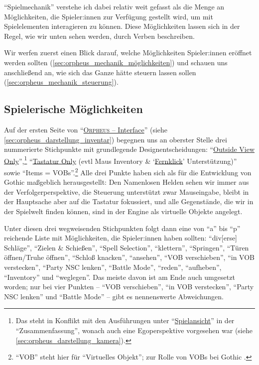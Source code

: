 \documentclass[a5paper,pagesize]{scrbook}
\begin{document}
\enquote{Spielmechanik} verstehe ich dabei relativ weit gefasst als die Menge an Möglichkeiten, die Spieler:innen zur Verfügung gestellt wird, um mit Spielelementen interagieren zu können.\autocite[255]{jaervinen_games_2008}
Diese Möglichkeiten lassen sich in der Regel, wie wir unten sehen werden, durch Verben beschreiben.\autocite[263]{jaervinen_games_2008}

Wir werfen zuerst einen Blick darauf, welche Möglichkeiten Spieler:innen eröffnet werden sollten (\autoref{sec:orpheus_mechanik_möglichkeiten}) und schauen uns anschließend an, wie sich das Ganze hätte steuern lassen sollen (\autoref{sec:orpheus_mechanik_steuerung}).


\subsection{Spielerische Möglichkeiten}\label{sec:orpheus_mechanik_möglichkeiten}
Auf der ersten Seite von \enquote{\uline{\textsc{Orpheus} -- Interface}}\autocite[Vgl.][]{orpheus_interface} (siehe \autoref{sec:orpheus_darstellung_inventar}) begegnen uns an oberster Stelle drei nummerierte Stichpunkte mit grundlegende Designentscheidungen:
\enquote{\uline{Outside View Only}},\footnote{Das steht in Konflikt mit den Ausführungen unter \enquote{\uline{Spielansicht}} in der \enquote{Zusammenfassung}, wonach auch eine Egoperspektive vorgesehen war (siehe \autoref{sec:orpheus_darstellung_kamera}).} \enquote{\uline{Tastatur Only} (evtl Maus Inventory \& \enquote{\uline{Fernklick}} Unterstützung)} sowie \enquote{Items = VOBs}.\footnote{\enquote{VOB} steht hier für \enquote{Virtuelles Objekt}; zur Rolle von VOBs bei Gothic \autocite[vgl.][]{wiki_vob}.}
Alle drei Punkte haben sich als für die Entwicklung von Gothic maßgeblich herausgestellt:
Den Namenlosen Helden sehen wir immer aus der Verfolgerperspektive, die Steuerung unterstützt zwar Mauseingabe, bleibt in der Hauptsache aber auf die Tastatur fokussiert, und alle Gegenstände, die wir in der Spielwelt finden können, sind in der Engine als virtuelle Objekte angelegt.

Unter diesen drei wegweisenden Stichpunkten folgt dann eine von \enquote{a} bis \enquote{p} reichende Liste mit Möglichkeiten, die Spieler:innen haben sollten:
\enquote{div[erse] Schläge}, \enquote{Zielen \& Schießen}, \enquote{Spell Selection}, \enquote{klettern}, \enquote{Springen}, \enquote{Türen öffnen/Truhe öffnen}, \enquote{Schloß knacken}, \enquote{ansehen}, \enquote{VOB verschieben}, \enquote{in VOB verstecken}, \enquote{Party NSC lenken}, \enquote{Battle Mode}, \enquote{reden}, \enquote{aufheben}, \enquote{Inventory} und \enquote{weglegen}.
Das meiste davon ist am Ende auch umgesetzt worden; nur bei vier Punkten -- \enquote{VOB verschieben}, \enquote{in VOB verstecken}, \enquote{Party NSC lenken} und \enquote{Battle Mode} -- gibt es nennenswerte Abweichungen.
\end{document}

